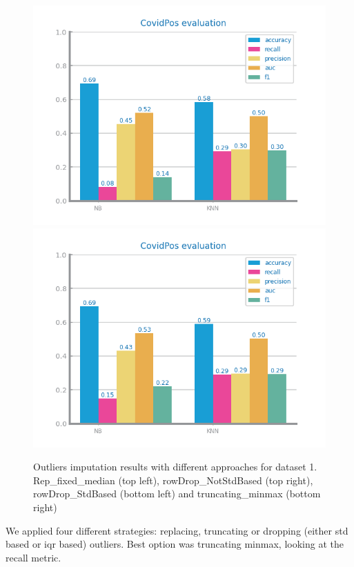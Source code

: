 \documentclass[10pt]{extarticle}
\begin{document}
\begin{figure}[H]
\includegraphics[scale=0.80]{images/dataset1/data_preparation/CovidPos_outliers_treat_rowDrop_StdBased.png}
\includegraphics[scale=0.80]{images/dataset1/data_preparation/CovidPos_outliers_treat_truncating_minmax.png}
\caption{Outliers imputation results with different approaches for dataset 1. Rep\_fixed\_median (top left), rowDrop\_NotStdBased (top right), rowDrop\_StdBased (bottom left) and truncating\_minmax (bottom right)}
\end{figure}
We applied four different strategies: replacing, truncating or dropping (either std based or iqr based) outliers.
Best option was truncating minmax, looking at the recall metric.
\end{document}
